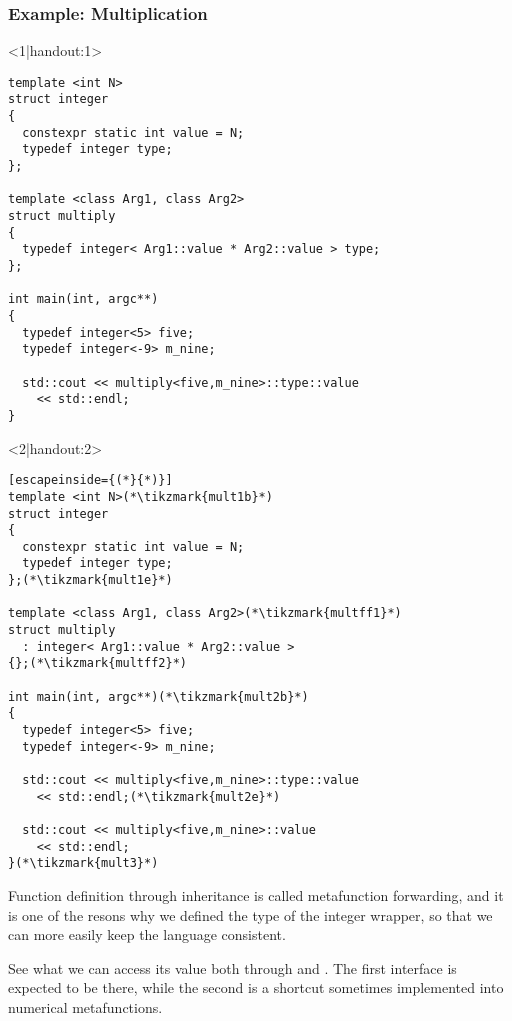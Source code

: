 \documentclass[11pt,a4paper,dvipsnames,usenames]{beamer}
\begin{document}
\begin{frame}[fragile]
  \frametitle{Example: Multiplication}

  \begin{onlyenv}<1|handout:1>
  \begin{lstlisting}
template <int N>
struct integer
{
  constexpr static int value = N;
  typedef integer type;
};

template <class Arg1, class Arg2>
struct multiply
{
  typedef integer< Arg1::value * Arg2::value > type;
};

int main(int, argc**)
{
  typedef integer<5> five;
  typedef integer<-9> m_nine;

  std::cout << multiply<five,m_nine>::type::value 
    << std::endl;
}
  \end{lstlisting}
  \end{onlyenv}

  \begin{onlyenv}<2|handout:2>
    \begin{lstlisting}[escapeinside={(*}{*)}]
template <int N>(*\tikzmark{mult1b}*)
struct integer
{
  constexpr static int value = N;
  typedef integer type;
};(*\tikzmark{mult1e}*)

template <class Arg1, class Arg2>(*\tikzmark{multff1}*)
struct multiply
  : integer< Arg1::value * Arg2::value >
{};(*\tikzmark{multff2}*)

int main(int, argc**)(*\tikzmark{mult2b}*)
{
  typedef integer<5> five;
  typedef integer<-9> m_nine;

  std::cout << multiply<five,m_nine>::type::value 
    << std::endl;(*\tikzmark{mult2e}*)

  std::cout << multiply<five,m_nine>::value 
    << std::endl;
}(*\tikzmark{mult3}*)
  \end{lstlisting}



  {
    Function definition through inheritance is called metafunction forwarding, and it is one of the resons why we
    defined the type of the integer wrapper, so that we can more easily keep the language consistent.

    \vspace{1em}

    See what we can access its value both through  and . The first
    interface is expected to be there, while the second is a shortcut sometimes implemented into numerical metafunctions.
  }

  \end{onlyenv}

\end{frame}
\end{document}
